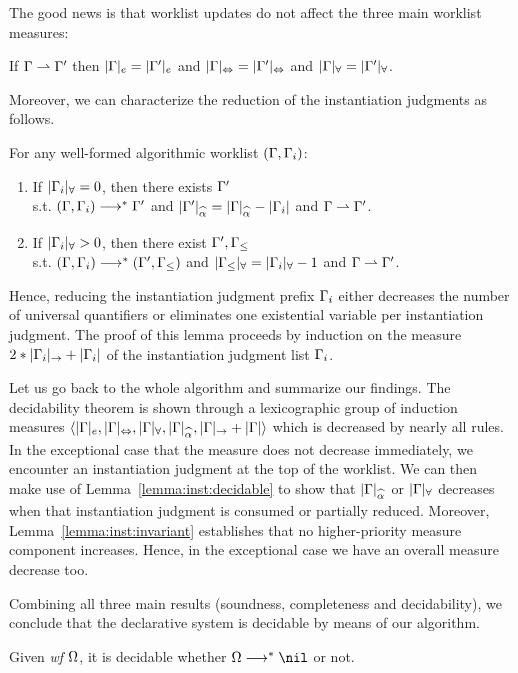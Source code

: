 The good news is that worklist updates do not affect the three main worklist measures:
\newcommand{\equivGm}[1]{|\Gm|_{#1} = |\Gm'|_{#1}}
\begin{lemma}\label{lemma:inst:invariant}
If $\Gamma\rightharpoonup\Gamma'$ then $\equivGm{e}$ and $\equivGm\Leftrightarrow$ and $\equivGm\forall$.
\end{lemma}

Moreover, we can characterize the reduction of the instantiation judgments as follows.
\begin{lemma}\label{lemma:inst:decidable}
For any well-formed algorithmic worklist $(\Gamma, \Gamma_i)$:
\begin{enumerate}[1)]
    \item If $|\Gamma_i|_\forall = 0$,
        then there exists $\Gamma'$\\
        s.t. $(\Gamma, \Gamma_i) \longrightarrow^* \Gamma'$ and $|\Gm'|_{\al} = |\Gm|_{\al} - |\Gm_i|$ and $\Gamma\rightharpoonup\Gamma'$.
    \item If $|\Gamma_i|_\forall > 0$,
        then there exist $\Gamma', \Gamma_\le$\\
        s.t. $(\Gamma, \Gamma_i) \longrightarrow^* (\Gamma', \Gamma_\le)$ and $|\Gamma_\le|_\forall = |\Gamma_i|_\forall - 1$ and $\Gamma\rightharpoonup\Gamma'$.
\end{enumerate}
\end{lemma}
Hence, reducing the instantiation judgment prefix $\Gamma_i$ either
decreases the number of universal quantifiers or 
eliminates one existential variable per instantiation judgment.
The proof of this lemma proceeds by induction on the measure $2*|\Gamma_i|_\to + |\Gamma_i|$
of the instantiation judgment list $\Gamma_i$.

Let us go back to the whole algorithm and summarize our findings.
The decidability theorem is shown through a lexicographic group of induction measures
$\langle |\Gm|_e, |\Gm|_\Leftrightarrow, |\Gm|_\forall, |\Gm|_{\al}, |\Gm|_\to + |\Gm| \rangle$
which is decreased by nearly all rules.
In the exceptional case that the measure does not decrease immediately, 
we encounter an instantiation judgment at the top of the worklist. We can then
make use of Lemma~\ref{lemma:inst:decidable} to show that $|\Gm|_{\al}$ or $|\Gamma|_\forall$ decreases
when that instantiation judgment is consumed or partially reduced.
Moreover, Lemma~\ref{lemma:inst:invariant} establishes
that no higher-priority measure component increases.
Hence, in the exceptional case we have an overall measure decrease too.

Combining all three main results (soundness, completeness and decidability), we conclude that the declarative system is decidable
by means of our algorithm.
\begin{corollary}
Given \emph{wf }$\Omega$, it is decidable whether $\Om\redto\nil$ or not.
\end{corollary}

